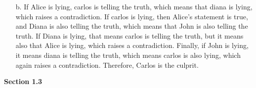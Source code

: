 \documentclass{article}
\begin{document}
\begin{enumerate}
\begin{enumerate}
\item[b.] If Alice is lying, carlos is telling the truth, which means that diana is lying, which raises a contradiction. If carlos is lying, then Alice's statement is true, and Diana is also telling the truth, which means that John is also telling the truth. If Diana is lying, that means carlos is telling the truth, but it means also that Alice is lying, which raises a contradiction. Finally, if John is lying, it means diana is telling the truth, which means carlos is also lying, which again raises a contradiction. Therefore, Carlos is the culprit.

\end{enumerate}

\end{enumerate}

\textbf{Section 1.3}
\end{document}
